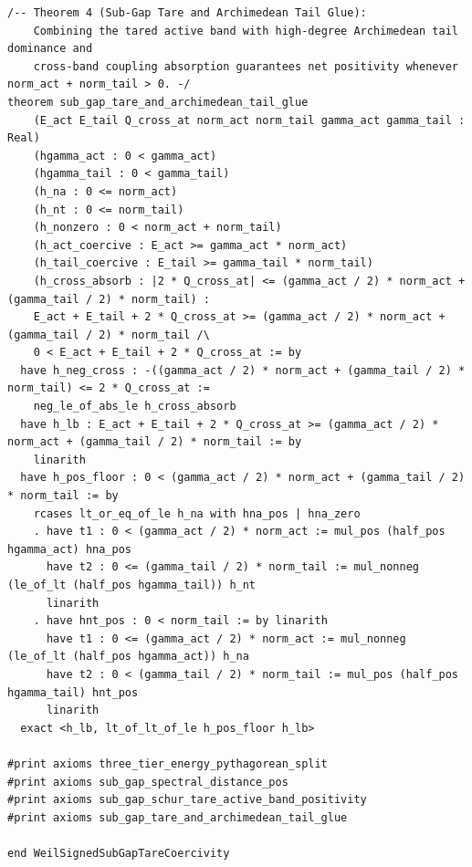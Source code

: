 \documentclass[11pt,a4paper]{article}
\begin{document}
\begin{lstlisting}[language=Lean4]
/-- Theorem 4 (Sub-Gap Tare and Archimedean Tail Glue):
    Combining the tared active band with high-degree Archimedean tail dominance and
    cross-band coupling absorption guarantees net positivity whenever norm_act + norm_tail > 0. -/
theorem sub_gap_tare_and_archimedean_tail_glue
    (E_act E_tail Q_cross_at norm_act norm_tail gamma_act gamma_tail : Real)
    (hgamma_act : 0 < gamma_act)
    (hgamma_tail : 0 < gamma_tail)
    (h_na : 0 <= norm_act)
    (h_nt : 0 <= norm_tail)
    (h_nonzero : 0 < norm_act + norm_tail)
    (h_act_coercive : E_act >= gamma_act * norm_act)
    (h_tail_coercive : E_tail >= gamma_tail * norm_tail)
    (h_cross_absorb : |2 * Q_cross_at| <= (gamma_act / 2) * norm_act + (gamma_tail / 2) * norm_tail) :
    E_act + E_tail + 2 * Q_cross_at >= (gamma_act / 2) * norm_act + (gamma_tail / 2) * norm_tail /\
    0 < E_act + E_tail + 2 * Q_cross_at := by
  have h_neg_cross : -((gamma_act / 2) * norm_act + (gamma_tail / 2) * norm_tail) <= 2 * Q_cross_at :=
    neg_le_of_abs_le h_cross_absorb
  have h_lb : E_act + E_tail + 2 * Q_cross_at >= (gamma_act / 2) * norm_act + (gamma_tail / 2) * norm_tail := by
    linarith
  have h_pos_floor : 0 < (gamma_act / 2) * norm_act + (gamma_tail / 2) * norm_tail := by
    rcases lt_or_eq_of_le h_na with hna_pos | hna_zero
    . have t1 : 0 < (gamma_act / 2) * norm_act := mul_pos (half_pos hgamma_act) hna_pos
      have t2 : 0 <= (gamma_tail / 2) * norm_tail := mul_nonneg (le_of_lt (half_pos hgamma_tail)) h_nt
      linarith
    . have hnt_pos : 0 < norm_tail := by linarith
      have t1 : 0 <= (gamma_act / 2) * norm_act := mul_nonneg (le_of_lt (half_pos hgamma_act)) h_na
      have t2 : 0 < (gamma_tail / 2) * norm_tail := mul_pos (half_pos hgamma_tail) hnt_pos
      linarith
  exact <h_lb, lt_of_lt_of_le h_pos_floor h_lb>

#print axioms three_tier_energy_pythagorean_split
#print axioms sub_gap_spectral_distance_pos
#print axioms sub_gap_schur_tare_active_band_positivity
#print axioms sub_gap_tare_and_archimedean_tail_glue

end WeilSignedSubGapTareCoercivity
\end{lstlisting}
\end{document}
